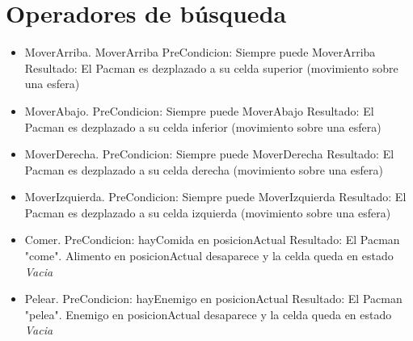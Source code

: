 \section{Operadores de búsqueda}
\begin{itemize}
\item MoverArriba.
MoverArriba
PreCondicion: Siempre puede MoverArriba
Resultado: El Pacman es dezplazado a su celda superior (movimiento sobre una esfera)
\item MoverAbajo.
PreCondicion: Siempre puede MoverAbajo
Resultado: El Pacman es dezplazado a su celda inferior (movimiento sobre una esfera)
\item MoverDerecha.
PreCondicion: Siempre puede MoverDerecha
Resultado: El Pacman es dezplazado a su celda derecha (movimiento sobre una esfera)
\item MoverIzquierda.
PreCondicion: Siempre puede MoverIzquierda
Resultado: El Pacman es dezplazado a su celda izquierda (movimiento sobre una esfera)
\item Comer.
PreCondicion: hayComida en posicionActual
Resultado: El Pacman "come". Alimento en posicionActual desaparece y la celda queda en estado \textit{Vacia}
\item Pelear.
PreCondicion: hayEnemigo en posicionActual
Resultado: El Pacman "pelea". Enemigo en posicionActual desaparece y la celda queda en estado \textit{Vacia}
\end{itemize}
